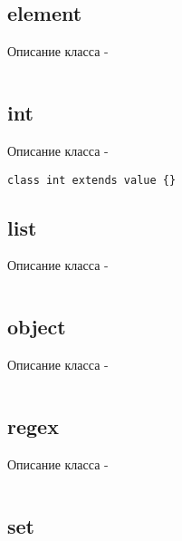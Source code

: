 \documentclass[a4paper, 14pt]{extarticle}
\begin{document}
\subsection{{\color{lightblue} element}}

Описание класса \element -
\begin{lstlisting}[numbers=none]

\end{lstlisting}

\subsection{{\color{lightblue} int}}

Описание класса \integer -
\begin{lstlisting}[numbers=none]
class int extends value {}
\end{lstlisting}

\subsection{{\color{lightblue} list}}

Описание класса \listtype -
\begin{lstlisting}[numbers=none]

\end{lstlisting}

\subsection{{\color{lightblue} object}}

Описание класса \object -
\begin{lstlisting}[numbers=none]

\end{lstlisting}

\subsection{{\color{lightblue} regex}}

Описание класса \regex -
\begin{lstlisting}[numbers=none]

\end{lstlisting}

\subsection{{\color{lightblue} set}}
\end{document}
